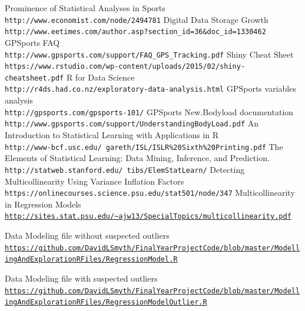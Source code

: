 \documentclass[a4paper, 12pt, twoside]{report}
\begin{document}
	\newpage		
	\begin{thebibliography}{1}
		Prominence of Statistical Analyses in Sports
		\\\texttt{http://www.economist.com/node/2494781}
		Digital Data Storage Growth
		\\\texttt{http://www.eetimes.com/author.asp?section\_id=36\&doc\_id=1330462}
		GPSports FAQ
		\\\texttt{http://www.gpsports.com/support/FAQ\_GPS\_Tracking.pdf}
		Shiny Cheat Sheet
		\\\texttt{https://www.rstudio.com/wp-content/uploads/2015/02/shiny-cheatsheet.pdf}
		R for Data Science
		\\\texttt{http://r4ds.had.co.nz/exploratory-data-analysis.html}
		GPSports variables analysis
		\\\texttt{http://gpsports.com/gpsports-101/}
		GPSports New.Bodyload documentation
		\\\texttt{http://www.gpsports.com/support/UnderstandingBodyLoad.pdf}
		An Introduction to Statistical Learning with Applications in R
		\\\texttt{http://www-bcf.usc.edu/~gareth/ISL/ISLR\%20Sixth\%20Printing.pdf}
		The Elements of Statistical Learning: Data Mining, Inference, and Prediction.
		\\\texttt{http://statweb.stanford.edu/~tibs/ElemStatLearn/}
		Detecting Multicollinearity Using Variance Inflation Factors
		\\\texttt{https://onlinecourses.science.psu.edu/stat501/node/347}
		Multicollinearity in Regression Models
		\\\texttt{\url{http://sites.stat.psu.edu/~ajw13/SpecialTopics/multicollinearity.pdf}}
		
		Data Modeling file without suspected outliers
		\\\texttt{\url{https://github.com/DavidLSmyth/FinalYearProjectCode/blob/master/ModellingAndExplorationRFiles/RegressionModel.R}}
		
		Data Modeling file with suspected outliers
		\\\texttt{\url{https://github.com/DavidLSmyth/FinalYearProjectCode/blob/master/ModellingAndExplorationRFiles/RegressionModelOutlier.R}}
		

\end{thebibliography}
\end{document}
